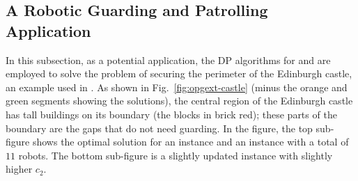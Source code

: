 \subsection{A Robotic Guarding and Patrolling Application}
In this subsection, as a potential application, the DP algorithms for 
\opglr and \opgmc are employed to solve the problem of securing the 
perimeter of the Edinburgh castle, an example used in 
\cite{FenHanGaoYu19RSS}. As shown in Fig.~\ref{fig:opgext-castle} (minus 
the orange and green segments showing the solutions), the central 
region of the Edinburgh castle has tall buildings on its boundary 
(the blocks in brick red); these parts of the boundary are the gaps 
that do not need guarding. In the figure, the top sub-figure shows 
the optimal solution for an \opglr instance and an \opgmc instance with 
a total of $11$ robots. The bottom sub-figure is a slightly updated 
\opgmc instance with slightly higher $c_2$. 
